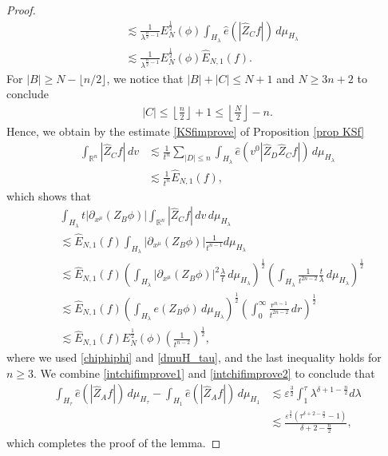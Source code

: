 \documentclass{article}
\newcommand{\bbr}{{\mathbb R}}
\newcommand{\bbrn}{{\bbr^n}}
\begin{document}
\begin{proof}
\begin{align}
& \lesssim \frac{ 1 }{ \lambda^{ \frac{ n }{ 2 } - 1 } } E_N^{ \frac12 } ( \phi ) \int_{ H_\lambda } \hat{ e } ( | \hat{ Z }_C f | ) \, d \mu_{ H_\lambda } \nonumber \\
& \lesssim \frac{ 1 }{ \lambda^{ \frac{ n }{ 2 } - 1 } } E_N^{ \frac12 } ( \phi ) \hat{ E }_{ N , 1 } ( f ) . \label{intchifimprove1}
\end{align}
For $ | B | \geq N - \lfloor n / 2 \rfloor $, we notice that $ | B | + | C | \leq N + 1 $ and $ N \geq 3 n + 2 $ to conclude
\begin{align*}
| C | \leq \left\lfloor \frac{ n }{ 2 } \right\rfloor + 1 \leq \left\lfloor \frac{ N }{ 2 } \right\rfloor - n .
\end{align*}
Hence, we obtain by the estimate \eqref{KSfimprove} of Proposition \ref{prop KSf}
\begin{align*}
\int_\bbrn | \hat{ Z }_C f | \, d v & \lesssim \frac{ 1 }{ t^n } \sum_{ | D | \leq n } \int_{ H_\lambda } \hat{ e } ( v^0 | \hat{ Z }_D \hat{ Z }_C f | ) \, d \mu_{ H_\lambda } \\
& \lesssim \frac{ 1 }{ t^n } \hat{ E }_{ N , 1 } ( f ) ,
\end{align*}
which shows that
\begin{align}
& \int_{ H_\lambda } t | \partial_{ x^\mu } ( Z_B \phi ) | \int_\bbrn | \hat{ Z }_C f | \, d v \, d \mu_{ H_\lambda } \nonumber \\
& \lesssim \hat{ E }_{ N , 1 } ( f ) \int_{ H_\lambda } | \partial_{ x^\mu } ( Z_B \phi ) | \frac{ 1 }{ t^{ n - 1 } } d \mu_{ H_\lambda } \nonumber \\
& \lesssim \hat{ E }_{ N , 1 } ( f ) \left( \int_{ H_\lambda } | \partial_{ x^\mu } ( Z_B \phi ) |^2 \frac{ \lambda }{ t } \, d \mu_{ H_\lambda } \right)^{ \frac{ 1 }{ 2 } } \left( \int_{ H_\lambda } \frac{ 1 }{ t^{ 2 n - 2 } } \frac{ t }{ \lambda } \, d \mu_{ H_\lambda } \right)^{ \frac{ 1 }{ 2 } } \nonumber \\
& \lesssim \hat{ E }_{ N , 1 } ( f ) \left( \int_{ H_\lambda } e ( Z_B \phi ) \, d \mu_{ H_\lambda } \right)^{ \frac{ 1 }{ 2 } } \left( \int_0^\infty \frac{ r^{ n - 1 } }{ t^{ 2 n - 2 } } \, d r \right)^{ \frac{ 1 }{ 2 } } \nonumber \\
& \lesssim \hat{ E }_{ N , 1 } ( f ) E_N^{ \frac12 } ( \phi ) \left( \frac{ 1 }{ t^{ n - 2 } } \right)^{ \frac12 } , \label{intchifimprove2}
\end{align}
where we used \eqref{chiphiphi} and \eqref{dmuH_tau}, and the last inequality holds for $ n \geq 3 $. We combine \eqref{intchifimprove1} and \eqref{intchifimprove2} to conclude that
\begin{align*}
\int_{ H_\tau } \hat{ e } ( | \hat{ Z }_A f | ) \, d \mu_{ H_\tau } - \int_{ H_1 } \hat{ e } ( | \hat{ Z }_A f | ) \, d \mu_{ H_1 } & \lesssim \varepsilon^{ \frac32 } \int_1^\tau \lambda^{ \delta + 1 - \frac{ n }{ 2 } } d \lambda \\
& \lesssim \frac{ \varepsilon^{ \frac32 } ( \tau^{ \delta + 2 - \frac{ n }{ 2 } } - 1 ) }{ \delta + 2 - \frac{ n }{ 2 } } ,
\end{align*}
which completes the proof of the lemma.
\end{proof}
\end{document}
